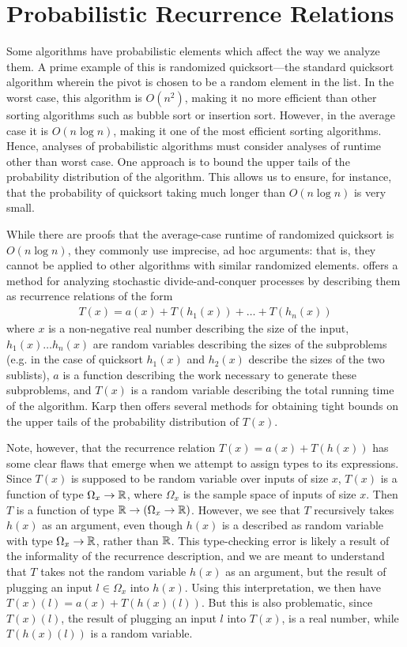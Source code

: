 \section{Probabilistic Recurrence Relations}

Some algorithms have probabilistic elements which affect the way we analyze them. A prime example of this is randomized 
quicksort---the standard quicksort algorithm wherein the pivot is chosen to be a random element in the list. In the worst case,
this algorithm is $O(n^2)$, making it no more efficient than other sorting algorithms such as bubble sort or insertion sort. 
However, in the average case it is $O(n\log n)$, making it one of the most efficient sorting algorithms. Hence, analyses of probabilistic algorithms must consider analyses of runtime other than worst case. One approach is to bound the upper
tails of the probability distribution of the algorithm. This allows us to ensure, for instance, that the probability of 
quicksort taking much longer than $O(n \log n)$ is very small. 

While there are proofs that the average-case runtime of randomized quicksort is $O(n\log n)$, they commonly use
imprecise, ad hoc arguments: that is, they cannot be applied to other algorithms with similar randomized elements. 
\cite{Karp} offers a method for analyzing stochastic divide-and-conquer processes by describing them as recurrence relations of the form
\begin{align*}
T(x) = a(x) + T(h_1(x)) + \dots + T(h_n(x))
\end{align*}
where $x$ is a non-negative real number describing the size of the input,\\ $h_1(x) \dots h_n(x)$ are random variables 
describing the sizes of the subproblems (e.g. in the case of quicksort $h_1(x)$ and $h_2(x)$ describe the sizes of the two 
sublists), $a$ is a function describing the work necessary to generate these subproblems, and $T(x)$ is a random variable 
describing the total running time of the algorithm. Karp then offers several methods for obtaining tight bounds on the upper tails of the probability distribution of $T(x)$. 

Note, however, that the recurrence relation $T(x) = a(x) + T(h(x))$ has some clear flaws that 
emerge when we attempt to assign types to its expressions. Since $T(x)$ is supposed to be random
variable over inputs of size $x$, $T(x)$ is a function of type 
$\Omega_x \rightarrow \mathbb{R}$, where $\Omega_x$ is the sample space of inputs of size $x$. Then $T$ is a 
function of type $\mathbb{R} \rightarrow (\Omega_x \rightarrow \mathbb{R})$. However, we see that $T$ recursively takes 
$h(x)$ as an argument, even though $h(x)$ is a described as random variable with type $\Omega_x \rightarrow \mathbb{R}$, 
rather than $\mathbb{R}$. This type-checking error is likely a result of the informality of the recurrence description, 
and we are meant to understand that $T$ takes not the 
random variable $h(x)$ as an argument, but the result of plugging an input $l \in \Omega_x$ into $h(x)$. Using this 
interpretation, we then have $T(x)(l) = a(x) + T(h(x)(l))$. But this is also problematic, since $T(x)(l)$, the result 
of plugging an input $l$ into $T(x)$, is a real number, while $T(h(x)(l))$ is a random variable. 

